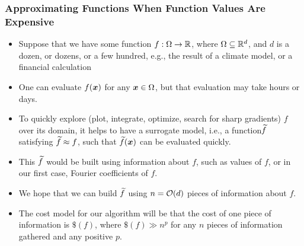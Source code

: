\documentclass[11pt,compress,xcolor={usenames,dvipsnames},aspectratio=169]{beamer}
\begin{document}
\begin{frame}
\frametitle{Approximating Functions When Function Values Are Expensive}

\vspace{-5ex}

\begin{itemize}
	\item Suppose that we have some function $f:\Omega \to \mathbb{R}$, where $\Omega \subseteq \mathbb{R}^d$, and $d$ is a dozen, or dozens, or a few hundred, e.g., the result of a climate model, or a financial calculation
	
	\item One can evaluate $f(\boldsymbol{x})$ for any $\boldsymbol{x} \in \Omega$,  but that evaluation may take hours or days.
	
	\item To quickly explore (plot, integrate, optimize, search for sharp gradients) $f$ over its domain, it helps to have a surrogate model, i.e., a function$\widetilde{f}$ satisfying $\widetilde{f} \approx f$, such that $\widetilde{f}(\boldsymbol{x})$ can be evaluated quickly.
	
	\item This $\widetilde{f}$ would be built using information about $f$, such as values of $f$, or in our first case, Fourier coefficients of $f$.
	
	\item We hope that we can build $\widetilde{f}$ using $n = \operatorname{{\mathcal O}}(d)$ pieces of information about $f$.

	\item The cost model for our algorithm will be that the cost of one piece of information is $\$(f)$, where $\$(f) \gg n^p$ for any $n$ pieces of information gathered and any positive $p$.
	
	
\end{itemize}

\end{frame}
\end{document}
